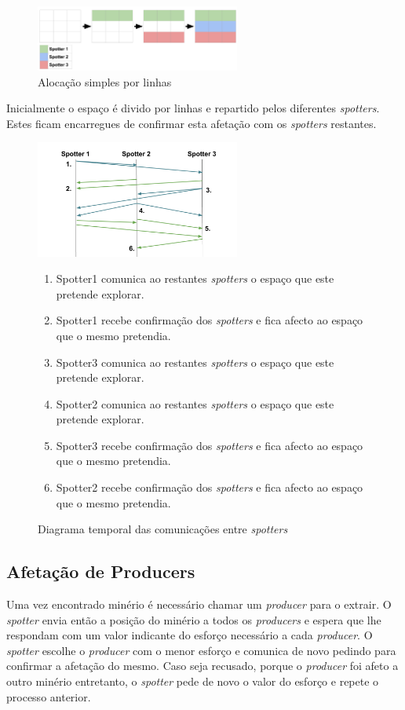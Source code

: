 \documentclass[12pt]{report}
\begin{document}
\begin{figure}[h]
  \centering
    \includegraphics[width=0.6\textwidth]{spotter-spaces}
  \caption{\small{Alocação simples por linhas}}
\end{figure}

Inicialmente o espaço é divido por linhas e repartido pelos diferentes \emph{spotters}. Estes ficam encarregues de confirmar esta
afetação com os \emph{spotters} restantes.

\begin{figure}[h]
  \centering
    \includegraphics[width=0.6\textwidth]{spotter-agreement}
  \caption{\small{Diagrama temporal das comunicações entre \emph{spotters}}}
  
  \begin{enumerate}
    \item Spotter1 comunica ao restantes \emph{spotters} o espaço que este pretende explorar.
    \item Spotter1 recebe confirmação dos \emph{spotters} e fica afecto ao espaço que o mesmo pretendia.
    \item Spotter3 comunica ao restantes \emph{spotters} o espaço que este pretende explorar.
    \item Spotter2 comunica ao restantes \emph{spotters} o espaço que este pretende explorar.
    \item Spotter3 recebe confirmação dos \emph{spotters} e fica afecto ao espaço que o mesmo pretendia.
    \item Spotter2 recebe confirmação dos \emph{spotters} e fica afecto ao espaço que o mesmo pretendia.
  \end{enumerate}
\end{figure}

\FloatBarrier
\newpage
\subsection{Afetação de Producers}
Uma vez encontrado minério é necessário chamar um \emph{producer} para o extrair. O \emph{spotter} envia então a posição do 
minério a todos os \emph{producers} e espera que lhe respondam com um valor indicante do esforço necessário a cada \emph{producer}.
O \emph{spotter} escolhe o \emph{producer} com o menor esforço e comunica de novo pedindo para confirmar a afetação do mesmo.
Caso seja recusado, porque o \emph{producer} foi afeto a outro minério entretanto, o \emph{spotter} pede de novo o valor do esforço
e repete o processo anterior.
\end{document}
